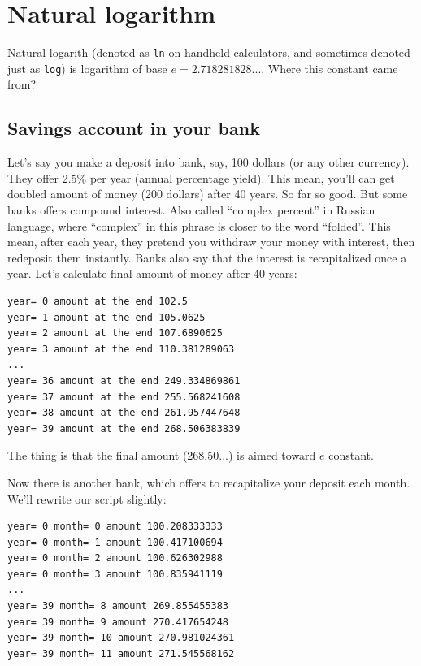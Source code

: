 \section{Natural logarithm}

Natural logarith (denoted as \texttt{ln} on handheld calculators, and sometimes denoted just as \texttt{log})
is logarithm of base $e=2.718281828...$.
Where this constant came from?

\subsection{Savings account in your bank}

Let's say you make a deposit into bank, say, 100 dollars (or any other currency).
They offer 2.5\% per year (annual percentage yield).
This mean, you'll can get doubled amount of money (200 dollars) after 40 years.
So far so good.
But some banks offers compound interest.
Also called ``complex percent'' in Russian language, where ``complex'' in this phrase is closer to the word ``folded''.
This mean, after each year, they pretend you withdraw your money with interest, then redeposit them instantly.
Banks also say that the interest is recapitalized once a year.
Let's calculate final amount of money after 40 years:



\begin{lstlisting}
year= 0 amount at the end 102.5
year= 1 amount at the end 105.0625
year= 2 amount at the end 107.6890625
year= 3 amount at the end 110.381289063
...
year= 36 amount at the end 249.334869861
year= 37 amount at the end 255.568241608
year= 38 amount at the end 261.957447648
year= 39 amount at the end 268.506383839
\end{lstlisting}

The thing is that the final amount (268.50...) is aimed toward $e$ constant.

Now there is another bank, which offers to recapitalize your deposit each month.
We'll rewrite our script slightly:



\begin{lstlisting}
year= 0 month= 0 amount 100.208333333
year= 0 month= 1 amount 100.417100694
year= 0 month= 2 amount 100.626302988
year= 0 month= 3 amount 100.835941119
...
year= 39 month= 8 amount 269.855455383
year= 39 month= 9 amount 270.417654248
year= 39 month= 10 amount 270.981024361
year= 39 month= 11 amount 271.545568162
\end{lstlisting}

